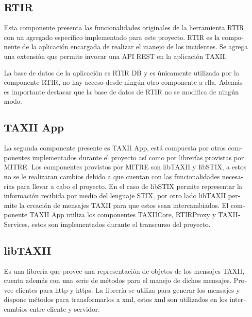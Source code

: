 	\subsection[RTIR]{\foreignlanguage{spanish}{RTIR}}
	\foreignlanguage{spanish}{Esta componente presenta las funcionalidades originales de la herramienta RTIR con un agregado
		específico implementado para este proyecto. RTIR es la componente de la aplicación encargada de realizar el manejo de
		los incidentes. Se agrega una extensión que permite invocar una API REST en la aplicación TAXII. \ }
	\bigskip
	
	\foreignlanguage{spanish}{La base de datos de la aplicación es RTIR DB y es únicamente utilizada por la componente RTIR,
		no hay acceso desde ningún otro componente a ella. Además es importante destacar que la base de datos de RTIR no se
		modifica de ningún modo.}
	
	
	\bigskip
	
	\subsection[TAXII App\ \ \ \ \ \ \ \ ]{\foreignlanguage{spanish}{TAXII App\ \ \ \ \ \ \ \ }}
	
	\bigskip
	
	\foreignlanguage{spanish}{La segunda componente presente es TAXII App, está compuesta por otros componentes
		implementados durante el proyecto así como por librerías provistas por MITRE. Los componentes provistos por MITRE son
		libTAXII y libSTIX, a estos no se le realizaran cambios debido a que cuentan con las funcionalidades necesarias para
		llevar a cabo el proyecto. En el caso de libSTIX permite representar la información recibida por medio del lenguaje
		STIX, por otro lado libTAXII permite la creación de mensajes TAXII para que estos sean intercambiados. El componente
		TAXII App utiliza los componentes TAXIICore, RTIRProxy y TAXIIServices, estos son implementados durante el transcurso
		del proyecto. }
	
	\subsection[libTAXII]{\foreignlanguage{spanish}{libTAXII}}
	\foreignlanguage{spanish}{Es una librería que provee una representación de objetos de los mensajes TAXII, cuenta además
		con una serie de métodos para el manejo de dichos mensajes. Provee clientes para http y https. La librería se utiliza
		para generar los mensajes y dispone métodos para transformarlos a xml, estos xml son utilizados en los intercambios
		entre cliente y servidor.}
	
